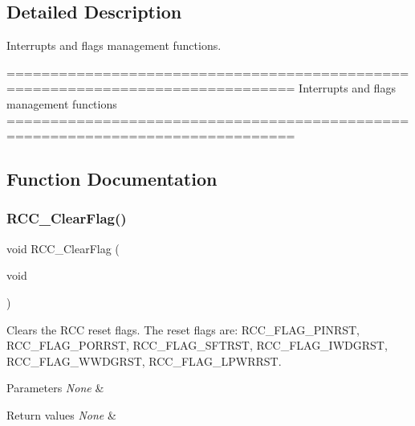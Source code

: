 \subsection{Detailed Description}
Interrupts and flags management functions. 

\begin{DoxyVerb} ===============================================================================
                   Interrupts and flags management functions
 ===============================================================================  \end{DoxyVerb}
 

\subsection{Function Documentation}
\mbox{\label{group__RCC__Group4_ga53f909dbb15a54124419084ebda97d72}} 
\subsubsection{R\+C\+C\+\_\+\+Clear\+Flag()}
{\footnotesize\ttfamily void R\+C\+C\+\_\+\+Clear\+Flag (\begin{DoxyParamCaption}\item[{void}]{ }\end{DoxyParamCaption})}



Clears the R\+CC reset flags. The reset flags are\+: R\+C\+C\+\_\+\+F\+L\+A\+G\+\_\+\+P\+I\+N\+R\+ST, R\+C\+C\+\_\+\+F\+L\+A\+G\+\_\+\+P\+O\+R\+R\+ST, R\+C\+C\+\_\+\+F\+L\+A\+G\+\_\+\+S\+F\+T\+R\+ST, R\+C\+C\+\_\+\+F\+L\+A\+G\+\_\+\+I\+W\+D\+G\+R\+ST, R\+C\+C\+\_\+\+F\+L\+A\+G\+\_\+\+W\+W\+D\+G\+R\+ST, R\+C\+C\+\_\+\+F\+L\+A\+G\+\_\+\+L\+P\+W\+R\+R\+ST. 


\begin{DoxyParams}{Parameters}
{\em None} & \\
\hline
\end{DoxyParams}

\begin{DoxyRetVals}{Return values}
{\em None} & \\
\hline
\end{DoxyRetVals}


